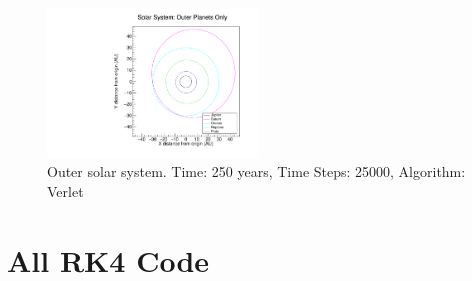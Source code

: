 \documentclass[a4paper,12pt]{report}
\begin{document}
   \begin{figure}
 \centering
   \includegraphics[width=0.5\textwidth]{outer_only_Verlet.pdf}
  \caption{Outer solar system. Time: 250 years, Time Steps: 25000, Algorithm: Verlet}
  \label{fig:outer_only_Verlet}
 \end{figure}
 
 \chapter{All RK4 Code}\label{app:rk4}
 \singlespacing
\end{document}
